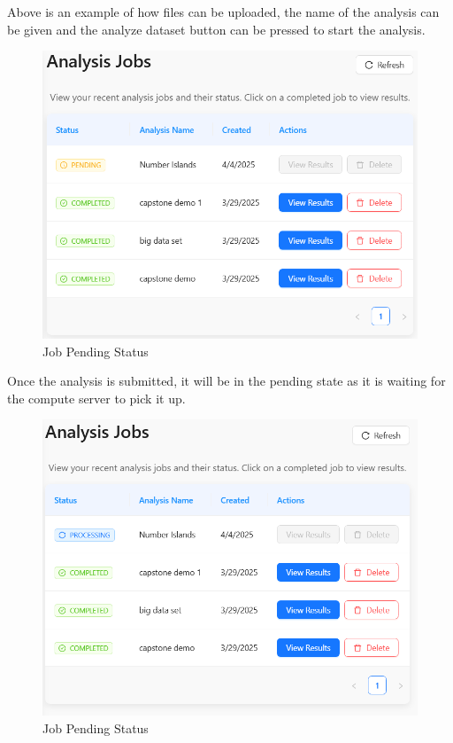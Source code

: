 \documentclass{article}
\begin{document}
Above is an example of how files can be uploaded, the name of the analysis can be given and the analyze dataset button can be pressed to start the analysis.

\begin{figure}[H]
    \centering
    \includegraphics[width=\textwidth]{JobStatus.png}
    \caption{Job Pending Status}
    \label{fig:Job Pending}
  \end{figure}

Once the analysis is submitted, it will be in the pending state as it is waiting for the compute server to pick it up.

\begin{figure}[H]
    \centering
    \includegraphics[width=\textwidth]{JobStatusProcessing.png}
    \caption{Job Pending Status}
    \label{fig:Job Processing}
  \end{figure}
\end{document}
